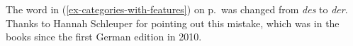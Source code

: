 

%


%
%


The word in (\ref{ex-categories-with-features}) on p.\,\pageref{ex-categories-with-features} was
changed from \emph{des} to \emph{der}. Thanks to Hannah Schleuper for
pointing out this mistake, which was in the books since the first German edition in 2010. 



